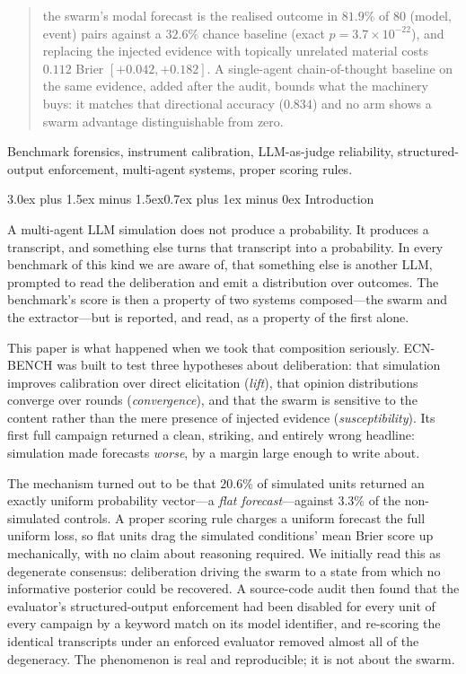 \documentclass[10pt,conference]{IEEEtran}
\makeatletter
\renewcommand\section{\@startsection{section}{1}{\z@}%
  {3.0ex plus 1.5ex minus 1.5ex}{0.7ex plus 1ex minus 0ex}%
  {\normalfont\normalsize\centering\bfseries}}
\makeatother
\begin{document}
\begin{abstract}
the swarm's modal forecast is the realised outcome in $81.9\%$ of $80$ (model, event) pairs against a $32.6\%$ chance baseline (exact $p = 3.7\times10^{-22}$), and replacing the injected evidence with topically unrelated material costs $0.112$ Brier $[+0.042, +0.182]$. A single-agent chain-of-thought baseline on the same evidence, added after the audit, bounds what the machinery buys: it matches that directional accuracy ($0.834$) and no arm shows a swarm advantage distinguishable from zero.
\end{abstract}

\begin{IEEEkeywords}
Benchmark forensics, instrument calibration, LLM-as-judge reliability, structured-output enforcement, multi-agent systems, proper scoring rules.
\end{IEEEkeywords}

\section{Introduction}
\label{sec:intro}

A multi-agent LLM simulation does not produce a probability. It produces a transcript, and something else turns that transcript into a probability. In every benchmark of this kind we are aware of, that something else is another LLM, prompted to read the deliberation and emit a distribution over outcomes. The benchmark's score is then a property of two systems composed---the swarm and the extractor---but is reported, and read, as a property of the first alone.

This paper is what happened when we took that composition seriously. ECN-BENCH was built to test three hypotheses about deliberation: that simulation improves calibration over direct elicitation (\emph{lift}), that opinion distributions converge over rounds (\emph{convergence}), and that the swarm is sensitive to the content rather than the mere presence of injected evidence (\emph{susceptibility}). Its first full campaign returned a clean, striking, and entirely wrong headline: simulation made forecasts \emph{worse}, by a margin large enough to write about.

The mechanism turned out to be that $20.6\%$ of simulated units returned an exactly uniform probability vector---a \emph{flat forecast}---against $3.3\%$ of the non-simulated controls. A proper scoring rule charges a uniform forecast the full uniform loss, so flat units drag the simulated conditions' mean Brier score up mechanically, with no claim about reasoning required. We initially read this as degenerate consensus: deliberation driving the swarm to a state from which no informative posterior could be recovered. A source-code audit then found that the evaluator's structured-output enforcement had been disabled for every unit of every campaign by a keyword match on its model identifier, and re-scoring the identical transcripts under an enforced evaluator removed almost all of the degeneracy. The phenomenon is real and reproducible; it is not about the swarm.
\end{document}
